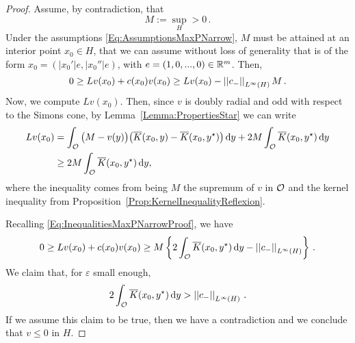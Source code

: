 \begin{proof}
	Assume, by contradiction, that
	$$
	M := \sup_H > 0\,.
	$$
	Under the assumptions \eqref{Eq:AssumptionsMaxPNarrow}, $M$ must be attained at an interior point $x_0 \in H$, that we can assume without loss of generality that is of the form $x_0 = (|x_0'|e,|x_0''|e)$, with $e=(1,0,...,0)\in\mathbb{R}^m$. Then,
	\begin{equation}
	\label{Eq:InequalitiesMaxPNarrowProof}
	0 \geq L v(x_0) + c(x_0)v(x_0) \geq L v(x_0) - \left | \left |{c_-} \right | \right |_{L^\infty(H)}M\,.
	\end{equation} 
	Now, we compute $L v(x_0)$. Then, since $v$ is doubly radial and odd with respect to the Simons cone, by Lemma~\ref{Lemma:PropertiesStar} we can write
	\begin{align*}
	Lv(x_0) &= \int_{\mathcal{O}} \big (M - v(y) \big) \big (\overline{K}(x_0,y) -\overline{K}(x_0,y^\star)\big) \,\mathrm{d} y + 2M\int_{\mathcal{O}} \overline{K}(x_0,y^\star)\,\mathrm{d} y\\
    &\geq2M \int_{\mathcal{O}} \overline{K}(x_0,y^\star)\,\mathrm{d} y,
	\end{align*}
    where the inequality comes from being $M$ the supremum of $v$ in $\mathcal{O}$ and the kernel inequality from Proposition~\ref{Prop:KernelInequalityReflexion}.   
    
	Recalling \eqref{Eq:InequalitiesMaxPNarrowProof}, we have
	$$
	0 \geq L v(x_0) + c(x_0)v(x_0)  \geq M \left\{ 2 \int_{\mathcal{O}} \overline{K}(x_0,y^\star)\,\mathrm{d} y - \left | \left |{c_-} \right | \right |_{L^\infty(H)}
	\right\}\,.
	$$
	We claim that, for $\varepsilon$ small enough,
	\begin{equation}
	\label{Eq:ClaimMaxPNarrowProof}
	 2 \int_{\mathcal{O}} \overline{K}(x_0,y^\star)\,\mathrm{d} y > \left | \left |{c_-} \right | \right |_{L^\infty(H)}\,.
	\end{equation}
	If we assume this claim to be true, then we have a contradiction and we conclude that $v \leq 0$ in $H$.
	

\end{proof}
